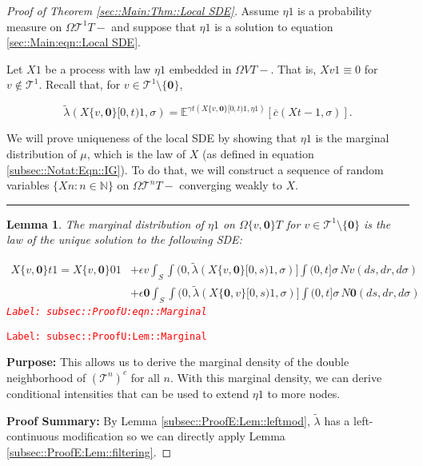 \documentclass[12pt]{article}
\newcommand{\mb}{\mathbb}
\newcommand{\mc}{\mathcal}
\newcommand{\ov}{\overline}
\newcommand{\ep}{\epsilon}
\newcommand{\tr}{\textcolor{red}}
\newcommand{\labe}[1]{\tr{\texttt{Label: #1}}}
\newcommand{\purpose}{\textbf{Purpose: }}
\newcommand{\pfsum}{\textbf{Proof Summary: }}
\newcommand{\ind}{\hspace{24pt}}
\newcommand{\lin}{\rule{\linewidth}{0.4 pt}}
\newcommand{\exmu}[2]{\mb{E}^{#1}\left[#2\right]}	%
\renewcommand{\root}{\mathbf{0}}				%
\renewcommand{\v}{v}							%
\renewcommand{\S}{S}							%
\newcommand{\s}{\sigma}							%
\newcommand{\ev}{\ep}							%
\newcommand{\T}{T}								%
\renewcommand{\t}{t}							%
\renewcommand{\tt}{s}							%
\newcommand{\X}{X}								%
\newcommand{\IGrg}{\ov{c}}						%
\newcommand{\tree}{\mc{T}}						%
\newcommand{\sln}[1]{^{#1}}						%
\newcommand{\poiss}{N}							%
\renewcommand{\r}{r}							%
\newcommand{\alt}[1]{\widetilde{#1}}			%
\newcommand{\m}{\mu}							%
\newcommand{\mmm}{\eta}							%
\newcommand{\cm}{\gamma}						%
\newcommand{\crate}{\alt{\lambda}}				%
\newtheorem{lem}[thms]{Lemma}
\begin{document}
\begin{proof}[Proof of Theorem \ref{sec::Main:Thm::Local SDE}]

Assume \(\mmm{}{}{1}\) is a probability measure on \(\Omega{\tree\sln{1}}{\T-}\) and suppose that \(\mmm{}{}{1}\) is a solution to equation \eqref{sec::Main:eqn::Local SDE}.

\ind Let \(\X{}{}{1}\) be a process with law \(\mmm{}{}{1}\) embedded in \(\Omega{V}{\T-}\). That is, \(\X{\v}{}{1} \equiv 0\) for \(\v \notin \tree\sln{1}\). Recall that, for \(\v \in \tree\sln{1}\setminus\{\root\}\),

\[\crate{}{}(\X{\{\v,\root\}}{[0,\t)}{1},\s) = \exmu{\cm{\t}(\X{\{\v,\root\}}{[0,\t)}{1},\mmm{}{}{1})}{\IGrg{}(\X{}{\t-}{1},\s)}.\]

\ind We will prove uniqueness of the local SDE by showing that \(\mmm{}{}{1}\) is the marginal distribution of \(\m{}{}{}\), which is the law of \(\X{}{}\) (as defined in equation \eqref{subsec::Notat:Eqn::IG}). To do that, we will construct a sequence of random variables \(\{\X{}{}{n}:n\in\mb{N}\}\) on \(\Omega{\tree\sln{n}}{\T-}\) converging weakly to \(\X{}{}\). 

\lin

\begin{lem}
The marginal distribution of \(\mmm{}{}{1}\) on \(\Omega{\{\v,\root\}}{\T}\) for \(\v \in \tree\sln{1}\setminus\{\root\}\) is the law of the unique solution to the following SDE:

\begin{align}
\X{\{\v,\root\}}{\t}{1} = \X{\{\v,\root\}}{0}{1} &+ \ev{\v}\int_\S\int{(0,\crate{}{}(\X{\{\v,\root\}}{[0,\tt)}{1},\s)]}\int{(0,\t]}\s\,\poiss{\v}(d\tt,d\r,d\s)\nonumber\\
&+ \ev{\root}\int_\S\int{(0,\crate{}{}(\X{\{\root,\v\}}{[0,\tt)}{1},\s)]}\int{(0,\t]}\s\,\poiss{\root}(d\tt,d\r,d\s)
\label{subsec::ProofU:eqn::Marginal}
\end{align}
\labe{subsec::ProofU:eqn::Marginal}
\label{subsec::ProofU:Lem::Marginal}
\end{lem}
\labe{subsec::ProofU:Lem::Marginal}

\purpose This allows us to derive the marginal density of the double neighborhood of \((\tree\sln{n})^c\) for all \(n\). With this marginal density, we can derive conditional intensities that can be used to extend \(\mmm{}{}{1}\) to more nodes.

\pfsum By Lemma \ref{subsec::ProofE:Lem::leftmod}, \(\crate{}{}\) has a left-continuous modification so we can directly apply Lemma \ref{subsec::ProofE:Lem::filtering}.


\end{proof}
\end{document}

